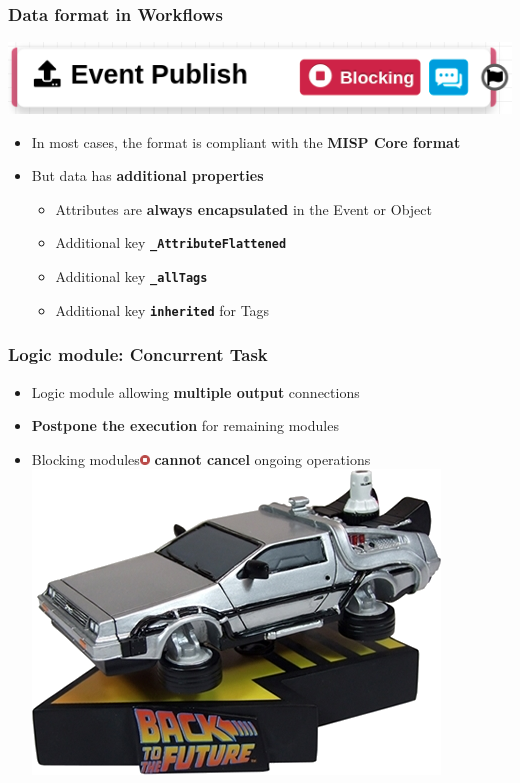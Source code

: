 \begin{frame}
    \frametitle{Data format in Workflows}
    \begin{center}
        \includegraphics[width=0.7\linewidth]{pictures/workflow-trigger.png}
    \end{center}
    \begin{itemize}
        \item In most cases, the format is compliant with the \textbf{MISP Core format}
        \item But data has \textbf{additional properties}
        \begin{itemize}
            \item Attributes are \textbf{always encapsulated} in the Event or Object
            \item Additional key \textbf{\texttt{\_AttributeFlattened}}
            \item Additional key \textbf{\texttt{\_allTags}}
            \item Additional key \textbf{\texttt{inherited}} for Tags
        \end{itemize}
    \end{itemize}
\end{frame}

\begin{frame}
    \frametitle{Logic module: Concurrent Task}
    \begin{itemize}
        \item Logic module allowing \textbf{multiple output} connections
        \item \textbf{Postpone the execution} for remaining modules
        \item Blocking modules\includegraphics[width=10px]{pictures/blocking-module.png} \textbf{cannot cancel} ongoing operations \includegraphics[width=0.05\linewidth]{pictures/time-machine.png}
    \end{itemize}
    \begin{center}
    \end{center}
\end{frame}

